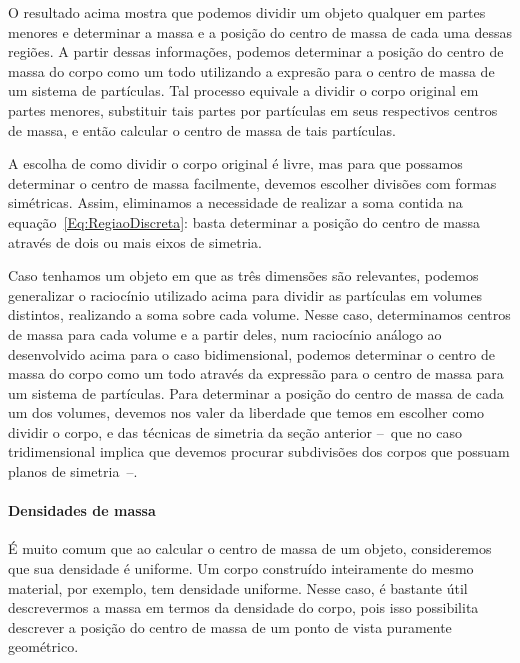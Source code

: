 O resultado acima mostra que podemos dividir um objeto qualquer em partes menores e determinar a massa e a posição do centro de massa de cada uma dessas regiões. A partir dessas informações, podemos determinar a posição do centro de massa do corpo como um todo utilizando a expresão para o centro de massa de um sistema de partículas. Tal processo equivale a dividir o corpo original em partes menores, substituir tais partes por partículas em seus respectivos centros de massa, e então calcular o centro de massa de tais partículas.

A escolha de como dividir o corpo original é livre, mas para que possamos determinar o centro de massa facilmente, devemos escolher divisões com formas simétricas. Assim, eliminamos a necessidade de realizar a soma contida na equação~\eqref{Eq:RegiaoDiscreta}: basta determinar a posição do centro de massa através de dois ou mais eixos de simetria.

Caso tenhamos um objeto em que as três dimensões são relevantes, podemos generalizar o raciocínio utilizado acima para dividir as partículas em volumes distintos, realizando a soma sobre cada volume. Nesse caso, determinamos centros de massa para cada volume e a partir deles, num raciocínio análogo ao desenvolvido acima para o caso bidimensional, podemos determinar o centro de massa do corpo como um todo através da expressão para o centro de massa para um sistema de partículas. Para determinar a posição do centro de massa de cada um dos volumes, devemos nos valer da liberdade que temos em escolher como dividir o corpo, e das técnicas de simetria da seção anterior --~que no caso tridimensional implica que devemos procurar subdivisões dos corpos que possuam planos de simetria~--.

\paragraph{Densidades de massa}

É muito comum que ao calcular o centro de massa de um objeto, consideremos que sua densidade é uniforme. Um corpo construído inteiramente do mesmo material, por exemplo, tem densidade uniforme. Nesse caso, é bastante útil descrevermos a massa em termos da densidade do corpo, pois isso possibilita descrever a posição do centro de massa de um ponto de vista puramente geométrico.


